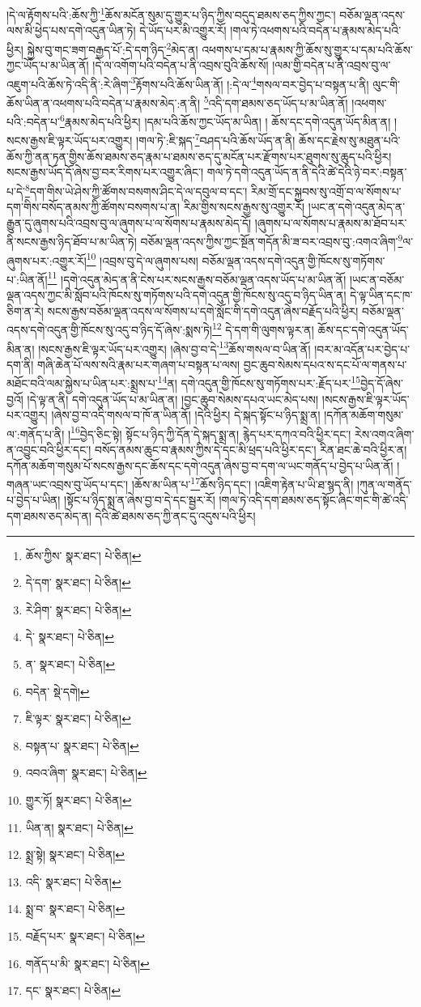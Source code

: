 །དེ་ལ་རྟོགས་པའི་:ཆོས་ཀྱི་\footnote{ཆོས་ཀྱིས་  སྣར་ཐང་།  པེ་ཅིན། }ཆོས་མངོན་སུམ་དུ་གྱུར་པ་ཉིད་ཀྱིས་བདུད་ཐམས་ཅད་ཀྱིས་ཀྱང་། བཅོམ་ལྡན་འདས་ལས་མི་ཕྱེད་པས་དགེ་འདུན་ཡིན་ཏེ། དེ་ཡོད་པར་མི་འགྱུར་རོ། །གལ་ཏེ་འཕགས་པའི་བདེན་པ་རྣམས་མེད་པའི་ཕྱིར། སྐྱེས་བུ་གང་ཟག་བརྒྱད་པོ་:དེ་དག་ཉིད་\footnote{དེ་དག་  སྣར་ཐང་།  པེ་ཅིན། }མེད་ན། འཕགས་པ་དམ་པ་རྣམས་ཀྱི་ཆོས་སུ་གྱུར་པ་དམ་པའི་ཆོས་ཀྱང་ཡོད་པ་མ་ཡིན་ནོ། །དེ་ལ་འགོག་པའི་བདེན་པ་ནི་འབྲས་བུའི་ཆོས་སོ། །ལམ་གྱི་བདེན་པ་ནི་འབྲས་བུ་ལ་འཇུག་པའི་ཆོས་ཏེ་འདི་ནི་:རེ་ཞིག་\footnote{རེ་ཤིག་  སྣར་ཐང་།  པེ་ཅིན། }རྟོགས་པའི་ཆོས་ཡིན་ནོ། །:དེ་ལ་\footnote{དེ་  སྣར་ཐང་།  པེ་ཅིན། }གསལ་བར་བྱེད་པ་བསྟན་པ་ནི། ལུང་གི་ཆོས་ཡིན་ན་འཕགས་པའི་བདེན་པ་རྣམས་མེད་:ན་ནི། \footnote{ན་  སྣར་ཐང་།  པེ་ཅིན། }འདི་དག་ཐམས་ཅད་ཡོད་པ་མ་ཡིན་ནོ། །འཕགས་པའི་:བདེན་པ་\footnote{བདེན་  སྡེ་དགེ། }རྣམས་མེད་པའི་ཕྱིར། །དམ་པའི་ཆོས་ཀྱང་ཡོད་མ་ཡིན། །
ཆོས་དང་དགེ་འདུན་ཡོད་མིན་ན། །སངས་རྒྱས་ཇི་ལྟར་ཡོད་པར་འགྱུར། །གལ་ཏེ་:ཇི་སྐད་\footnote{ཇི་ལྟར་  སྣར་ཐང་།  པེ་ཅིན། }བཤད་པའི་ཆོས་ཡོད་ན་ནི། ཆོས་དང་རྗེས་སུ་མཐུན་པའི་ཆོས་ཀྱི་ནན་ཏན་གྱིས་ཆོས་ཐམས་ཅད་རྣམ་པ་ཐམས་ཅད་དུ་མངོན་པར་རྫོགས་པར་ཐུགས་སུ་ཆུད་པའི་ཕྱིར། སངས་རྒྱས་ཡོད་དོ་ཞེས་བྱ་བར་རིགས་པར་འགྱུར་ཞིང་། གལ་ཏེ་དགེ་འདུན་ཡོད་ན་ནི་དེའི་ཚེ་དེའི་ཉེ་བར་:བསྟན་པ་དེ་\footnote{བསྟན་པ་  སྣར་ཐང་།  པེ་ཅིན། }དག་གིས་ཡེ་ཤེས་ཀྱི་ཚོགས་བསགས་ཤིང་དེ་ལ་དབུལ་བ་དང་། རིམ་གྲོ་དང་སྐྱབས་སུ་འགྲོ་བ་ལ་སོགས་པ་དག་གིས་བསོད་ནམས་ཀྱི་ཚོགས་བསགས་པ་ན། རིམ་གྱིས་སངས་རྒྱས་སུ་འགྱུར་རོ། །ཡང་ན་དགེ་འདུན་མེད་ན་རྒྱུན་དུ་ཞུགས་པའི་འབྲས་བུ་ལ་ཞུགས་པ་ལ་སོགས་པ་རྣམས་མེད་དོ། །ཞུགས་པ་ལ་སོགས་པ་རྣམས་མ་ཐོབ་པར་ནི་སངས་རྒྱས་ཉིད་ཐོབ་པ་མ་ཡིན་ཏེ། བཅོམ་ལྡན་འདས་ཀྱིས་ཀྱང་སྔོན་གདོན་མི་ཟ་བར་འབྲས་བུ་:འགའ་ཞིག་\footnote{འབའ་ཞིག་  སྣར་ཐང་།  པེ་ཅིན། }ལ་ཞུགས་པར་:འགྱུར་རོ།\footnote{གྱུར་ཏོ།  སྣར་ཐང་།  པེ་ཅིན། } །འབྲས་བུ་དེ་ལ་ཞུགས་པས། བཅོམ་ལྡན་འདས་དགེ་འདུན་གྱི་ཁོངས་སུ་གཏོགས་པ་:ཡིན་ནོ།\footnote{ཡིན་ན།  སྣར་ཐང་།  པེ་ཅིན། } །དགེ་འདུན་མེད་ན་ནི་ངེས་པར་སངས་རྒྱས་བཅོམ་ལྡན་འདས་ཡོད་པ་མ་ཡིན་ནོ། །ཡང་ན་བཅོམ་ལྡན་འདས་ཀྱང་མི་སློབ་པའི་ཁོངས་སུ་གཏོགས་པའི་དགེ་འདུན་གྱི་ཁོངས་སུ་འདུ་བ་ཉིད་ཡིན་ན། དེ་ལྟ་ཡིན་དང་ཁ་ཅིག་ན་རེ། སངས་རྒྱས་བཅོམ་ལྡན་འདས་ལ་སོགས་པ་དགེ་སློང་གི་དགེ་འདུན་ཞེས་བརྗོད་པའི་ཕྱིར། བཅོམ་ལྡན་འདས་དགེ་འདུན་གྱི་ཁོངས་སུ་འདུ་བ་ཉིད་དོ་ཞེས་:སྨས་ཏེ།\footnote{སྨྲ་སྟེ།  སྣར་ཐང་།  པེ་ཅིན། } དེ་དག་གི་ལུགས་ལྟར་ན། ཆོས་དང་དགེ་འདུན་ཡོད་མིན་ན། །སངས་རྒྱས་ཇི་ལྟར་ཡོད་པར་འགྱུར། །ཞེས་བྱ་བ་དེ་\footnote{འདི་  སྣར་ཐང་།  པེ་ཅིན། }ཆོས་གསལ་བ་ཡིན་ནོ། །བར་མ་འདོན་པར་བྱེད་པ་དག་ནི། གཞི་ཆེན་པོ་ལས་སའི་རྣམ་པར་གཞག་པ་བསྟན་པ་ལས། བྱང་ཆུབ་སེམས་དཔའ་ས་དང་པོ་ལ་གནས་པ་མཐོང་བའི་ལམ་སྐྱེས་པ་ཡིན་པར་:སྨྲས་པ་\footnote{སྨྲ་བ་  སྣར་ཐང་།  པེ་ཅིན། }ན། དགེ་འདུན་གྱི་ཁོངས་སུ་གཏོགས་པར་:རྗོད་པར་\footnote{བརྗོད་པར་  སྣར་ཐང་།  པེ་ཅིན། }བྱེད་དོ་ཞེས་བྱའོ། །དེ་ལྟ་ན་ནི། དགེ་འདུན་ཡོད་པ་མ་ཡིན་ན། །བྱང་ཆུབ་སེམས་དཔའ་ཡང་མེད་པས། །སངས་རྒྱས་ཇི་ལྟར་ཡོད་པར་འགྱུར། །ཞེས་བྱ་བ་འདི་གསལ་བ་ཁོ་ན་ཡིན་ནོ། །དེའི་ཕྱིར། དེ་སྐད་སྟོང་པ་ཉིད་སྨྲ་ན། །དཀོན་མཆོག་གསུམ་ལ་:གནོད་པ་ནི། །\footnote{གནོད་པ་མི་  སྣར་ཐང་།  པེ་ཅིན། }བྱེད་ཅིང་སྟེ། སྟོང་པ་ཉིད་ཀྱི་དོན་དེ་སྐད་སྨྲ་ན། རྙེད་པར་དཀའ་བའི་ཕྱིར་དང་། རེས་འགའ་ཞིག་ན་འབྱུང་བའི་ཕྱིར་དང་། བསོད་ནམས་ཆུང་བ་རྣམས་ཀྱིས་དེ་དང་མི་ཕྲད་པའི་ཕྱིར་དང་། རིན་ཐང་ཆེ་བའི་ཕྱིར་ན། དཀོན་མཆོག་གསུམ་པོ་སངས་རྒྱས་དང་ཆོས་དང་དགེ་འདུན་ཞེས་བྱ་བ་དག་ལ་ཡང་གནོད་པ་བྱེད་པ་ཡིན་ནོ། །གཞན་ཡང་འབྲས་བུ་ཡོད་པ་དང་། །ཆོས་མ་ཡིན་པ་\footnote{དང་  སྣར་ཐང་།  པེ་ཅིན། }ཆོས་ཉིད་དང་། །འཇིག་རྟེན་པ་ཡི་ཐ་སྙད་ནི། །ཀུན་ལ་གནོད་པ་བྱེད་པ་ཡིན། །སྟོང་པ་ཉིད་སྨྲ་ན་ཞེས་བྱ་བ་དེ་དང་སྦྱར་རོ། །གལ་ཏེ་འདི་དག་ཐམས་ཅད་སྟོང་ཞིང་གང་གི་ཚེ་འདི་དག་ཐམས་ཅད་མེད་ན། དེའི་ཚེ་ཐམས་ཅད་ཀྱི་ནང་དུ་འདུས་པའི་ཕྱིར། 